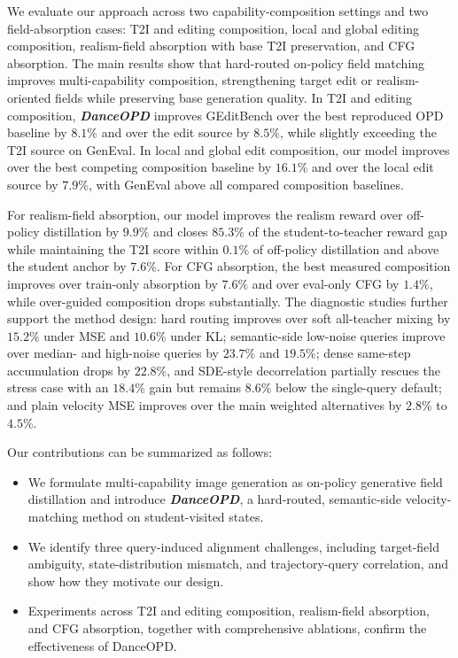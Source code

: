 \documentclass{llmxive}
\providecommand{\name}{\textsl{\textbf{DanceOPD}}\xspace}
\begin{document}
We evaluate our approach across two capability-composition settings and two field-absorption cases: T2I and editing composition, local and global editing composition, realism-field absorption with base T2I preservation, and CFG absorption. The main results show that hard-routed on-policy field matching improves multi-capability composition, strengthening target edit or realism-oriented fields while preserving base generation quality. 
In T2I and editing composition, \name{} improves GEditBench over the best reproduced OPD baseline by $8.1\%$ and over the edit source by $8.5\%$, while slightly exceeding the T2I source on GenEval. 
In local and global edit composition, our model improves over the best competing composition baseline by $16.1\%$ and over the local edit source by $7.9\%$, with GenEval above all compared composition baselines. 

For realism-field absorption, our model improves the realism reward over off-policy distillation by $9.9\%$ and closes $85.3\%$ of the student-to-teacher reward gap while maintaining the T2I score within $0.1\%$ of off-policy distillation and above the student anchor by $7.6\%$. For CFG absorption, the best measured composition improves over train-only absorption by $7.6\%$ and over eval-only CFG by $1.4\%$, while over-guided composition drops substantially. The diagnostic studies further support the method design: hard routing improves over soft all-teacher mixing by $15.2\%$ under MSE and $10.6\%$ under KL; semantic-side low-noise queries improve over median- and high-noise queries by $23.7\%$ and $19.5\%$; dense same-step accumulation drops by $22.8\%$, and SDE-style decorrelation partially rescues the stress case with an $18.4\%$ gain but remains $8.6\%$ below the single-query default; and plain velocity MSE improves over the main weighted alternatives by $2.8\%$ to $4.5\%$.


Our contributions can be summarized as follows:
\begin{itemize}[left=1pt]
    \item We formulate multi-capability image generation as on-policy generative field distillation and introduce \name{}, a hard-routed, semantic-side velocity-matching method on student-visited states.
    \item We identify three query-induced alignment challenges, including target-field ambiguity, state-distribution mismatch, and trajectory-query correlation, and show how they motivate our design.
    \item Experiments across T2I and editing composition, realism-field absorption, and CFG absorption, together with comprehensive ablations, confirm the effectiveness of DanceOPD.
\end{itemize}
\end{document}
